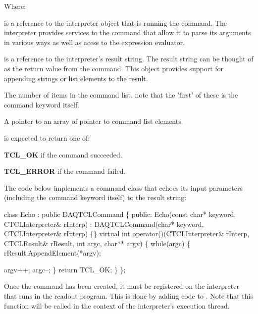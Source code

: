       Where:
      \begin{description}
	 \item{} is a reference to the interpreter
	    object that is running the command.  The interpreter
	    provides services to the command that allow it to
	    parse its arguments in various ways as well as acess
	    to the expression evaluator.
	 \item{} is a reference to the interpreter's
	    result string.  The result string can be thought of
	    as the return value from the command.  This object 
	    provides support for appending strings or list elements
	    to the result.
	 \item{} The number of items in the command list. 
	    note that the 'first' of these is the command
	    keyword itself.
	 \item{} A pointer to an array of 
	     pointer to command list elements.
      \end{description}
       is expected to return one of:
      \begin{description}
	 \item{\bf TCL\_OK} if the command succeeded.
	 \item{\bf TCL\_ERROR} if the command failed.
      \end{description}
      
      The code below implements a command class that
      echoes its input parameters (including the command
      keyword itself) to the result string:
      \begin{example}
      class Echo : public DAQTCLCommand \{
      public:
	 Echo(const char* keyword, 
	      CTCLInterpreter\& rInterp) :
	    DAQTCLCommand(char* keyword, 
			  CTCLInterpreter\& rInterp) \{\}
	 virtual int operator()(CTCLInterpreter\& rInterp,
			        CTCLResult\&      rResult,
				int               argc,
				char**            argv) \{
	    while(argc) \{
	       rResult.AppendElement(*argv);
	    
	       argv++;
	       argc--;
	    \}
	    return TCL_OK;
	 \}
      \};
      \end{example}
      
      Once the command has been created, it must be 
      registered on the interpreter that runs in the 
      readout program.  This is done by adding code to 
      .  Note that this function 
      will be called in the context of the interpreter's
      execution thread.
      
